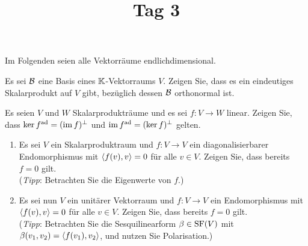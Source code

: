 \documentclass[a4paper, 10pt]{scrartcl}
\title{Tag 3}
\author{}
\date{}
\begin{document}





Im Folgenden seien alle Vektorräume endlichdimensional.

\begin{question}[subtitle = Existenz von Skalarprodukten]
  Es sei $\mathcal{B}$ eine Basis eines $\mathbb{K}$-Vektorraums $V$.
  Zeigen Sie, dass es ein eindeutiges Skalarprodukt auf $V$ gibt, bezüglich dessen $\mathcal{B}$ orthonormal ist.
\end{question}










\begin{question}[subtitle = Kern und Bild der adjungierten Abbildung]
  Es seien $V$ und $W$ Skalarprodukträume und es sei $f \colon V \to W$ linear.
  Zeigen Sie, dass $\ker f^{\operatorname{ad}} = (\operatorname{im} f)^\perp$ und $\operatorname{im} f^{\operatorname{ad}} = (\ker f)^\perp$ gelten.
\end{question}





\begin{question}[subtitle = Endomorphismen mit {$\bil{f(v)}{v} = 0$}]
  \begin{enumerate}
    \item
      Es sei $V$ ein Skalarproduktraum und $f \colon V \to V$ ein diagonalisierbarer Endomorphismus mit $\bil{f(v)}{v} = 0$ für alle $v \in V$.
      Zeigen Sie, dass bereits $f = 0$ gilt.
      \\
      (\emph{Tipp}:
      Betrachten Sie die Eigenwerte von $f$.)
    \item
      Es sei nun $V$ ein unitärer Vektorraum und $f \colon V \to V$ ein Endomorphismus mit $\bil{f(v)}{v} = 0$ für alle $v \in V$.
      Zeigen Sie, dass bereits $f = 0$ gilt.
      \\
      (\emph{Tipp}:
       Betrachten Sie die Sesquilinearform $\beta \in \operatorname{SF}(V)$ mit $\beta(v_1, v_2) = \left\langle f(v_1), v_2 \right\rangle$, und nutzen Sie Polarisation.)
  \end{enumerate}
\end{question}
\end{document}
